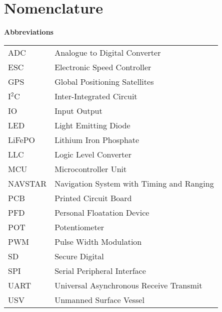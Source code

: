 \chapter{Nomenclature}
\huge{\textbf{Abbreviations}}
\vspace{1cm}
\begin{table}[!ht]
\begin{tabular}{l l}
	ADC & Analogue to Digital Converter\\
	ESC & Electronic Speed Controller\\
	GPS & Global Positioning Satellites\\
	I$^2$C & Inter-Integrated Circuit\\
	IO & Input Output\\
	LED & Light Emitting Diode \\
	LiFePO & Lithium Iron Phosphate \\
	LLC & Logic Level Converter \\
	MCU & Microcontroller Unit \\
	NAVSTAR & Navigation System with Timing and Ranging\\
	PCB & Printed Circuit Board\\
	PFD & Personal Floatation Device \\
	POT & Potentiometer \\
	PWM & Pulse Width Modulation \\
	SD & Secure Digital\\
	SPI & Serial Peripheral Interface \\
	UART & Universal Asynchronous Receive Transmit \\
	USV & Unmanned Surface Vessel \\
\end{tabular}
\end{table}
\normalsize